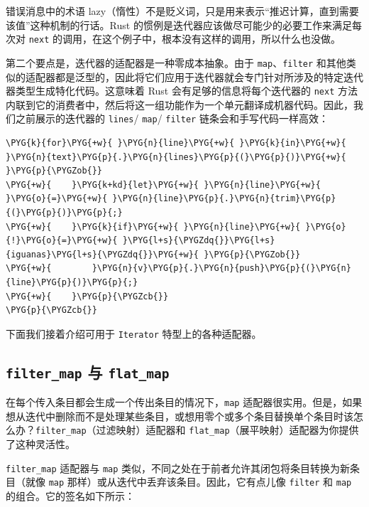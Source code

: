 错误消息中的术语 lazy（惰性）不是贬义词，只是用来表示“推迟计算，直到需要该值”这种机制的行话。Rust 的惯例是迭代器应该做尽可能少的必要工作来满足每次对 \texttt{next} 的调用，在这个例子中，根本没有这样的调用，所以什么也没做。

第二个要点是，迭代器的适配器是一种零成本抽象。由于 \texttt{map}、\texttt{filter} 和其他类似的适配器都是泛型的，因此将它们应用于迭代器就会专门针对所涉及的特定迭代器类型生成特化代码。这意味着 Rust 会有足够的信息将每个迭代器的 \texttt{next} 方法内联到它的消费者中，然后将这一组功能作为一个单元翻译成机器代码。因此，我们之前展示的迭代器的 \texttt{lines}/ \texttt{map}/ \texttt{filter} 链条会和手写代码一样高效：

\begin{Verbatim}[commandchars=\\\{\},breaklines=true,breakanywhere=true,fontsize=\codefont,xleftmargin=17bp]
\PYG{k}{for}\PYG{+w}{ }\PYG{n}{line}\PYG{+w}{ }\PYG{k}{in}\PYG{+w}{ }\PYG{n}{text}\PYG{p}{.}\PYG{n}{lines}\PYG{p}{(}\PYG{p}{)}\PYG{+w}{ }\PYG{p}{\PYGZob{}}
\PYG{+w}{    }\PYG{k+kd}{let}\PYG{+w}{ }\PYG{n}{line}\PYG{+w}{ }\PYG{o}{=}\PYG{+w}{ }\PYG{n}{line}\PYG{p}{.}\PYG{n}{trim}\PYG{p}{(}\PYG{p}{)}\PYG{p}{;}
\PYG{+w}{    }\PYG{k}{if}\PYG{+w}{ }\PYG{n}{line}\PYG{+w}{ }\PYG{o}{!}\PYG{o}{=}\PYG{+w}{ }\PYG{l+s}{\PYGZdq{}}\PYG{l+s}{iguanas}\PYG{l+s}{\PYGZdq{}}\PYG{+w}{ }\PYG{p}{\PYGZob{}}
\PYG{+w}{        }\PYG{n}{v}\PYG{p}{.}\PYG{n}{push}\PYG{p}{(}\PYG{n}{line}\PYG{p}{)}\PYG{p}{;}
\PYG{+w}{    }\PYG{p}{\PYGZcb{}}
\PYG{p}{\PYGZcb{}}
\end{Verbatim}

下面我们接着介绍可用于 \texttt{Iterator} 特型上的各种适配器。

\subsection{\texttt{filter\_map} 与 \texttt{flat\_map}}

在每个传入条目都会生成一个传出条目的情况下，\texttt{map} 适配器很实用。但是，如果想从迭代中删除而不是处理某些条目，或想用零个或多个条目替换单个条目时该怎么办？\texttt{filter\_map}（过滤映射）适配器和 \texttt{flat\_map}（展平映射）适配器为你提供了这种灵活性。

\texttt{filter\_map} 适配器与 \texttt{map} 类似，不同之处在于前者允许其闭包将条目转换为新条目（就像 \texttt{map} 那样）或从迭代中丢弃该条目。因此，它有点儿像 \texttt{filter} 和 \texttt{map} 的组合。它的签名如下所示：

